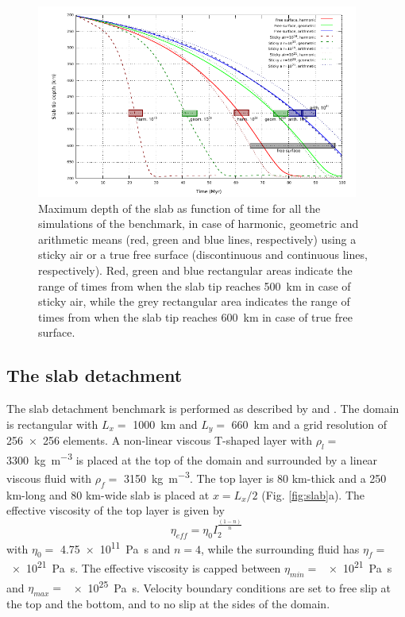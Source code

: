 \documentclass[hidelinks,10pt,a4paper]{article}
\begin{document}
\begin{figure}
\centering
\noindent\includegraphics[width=400px]{./Figures/Subduction.pdf}
\caption{Maximum depth of the slab as function of time for all the simulations of the \citet{Schmeling2008} benchmark, in case of harmonic, geometric and
arithmetic means (red, green and blue lines, respectively) using a sticky air or a true free surface (discontinuous and continuous lines, respectively).
Red, green and blue rectangular areas indicate the range of times from \citet{Schmeling2008} when the slab tip reaches \SI{500}{\km} in case of sticky air,
while the grey rectangular area indicates the range of times from \citet{Schmeling2008} when the slab tip reaches \SI{600}{\km} in case of true free surface.}
\label{fig:subduction}
\end{figure}

\subsection{The slab detachment}\label{sec:slab}
The slab detachment benchmark is performed as described by \citet{Schmalholz2011} and \citet{Glerum2018}. The domain is rectangular with $L_x=$ \SI{1000}{\km}
and $L_y=$ \SI{660}{\km} and a grid resolution of \num{256x256} elements. A non-linear viscous T-shaped layer with $\rho_l=$ \SI{3300}{\kg\per\cubic\metre} is
placed at the top of the domain and surrounded by a linear viscous fluid with $\rho_f=$ \SI{3150}{\kg\per\cubic\m}. The top layer is 80 km-thick and a 250
km-long and 80 km-wide slab is placed at $x=L_x/2$ (Fig. \ref{fig:slab}a). The effective viscosity of the top layer is given by
\[\eta_{eff}=\eta_0 I_2^{\frac{(1-n)}{n}}\]
with $\eta_0=$ \SI{4.75e11}{\pascal\s} and $n=4$, while the surrounding fluid has $\eta_f=$ \SI{e21}{\pascal\s}. The effective viscosity is capped between
$\eta_{min}=$ \SI{e21}{\pascal\s} and $\eta_{max}=$ \SI{e25}{\pascal\s}. Velocity boundary conditions are set to free slip at the top and the bottom, and to
no slip at the sides of the domain.
\end{document}
